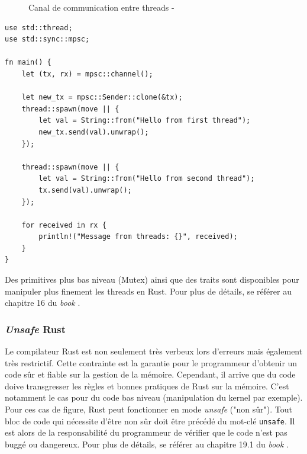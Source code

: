 \documentclass[a4paper, 12pt]{article}
\newenvironment{code}{\captionsetup{type=listing}}{}
\begin{document}
\begin{figure}
    \begin{center}
    \end{center}
    \caption{Canal de communication entre threads - \cite{ref37}}
    \label{rust_channel}
\end{figure}
\bigbreak
\begin{code}
    \begin{verbatim}
use std::thread;
use std::sync::mpsc;

fn main() {
    let (tx, rx) = mpsc::channel();

    let new_tx = mpsc::Sender::clone(&tx);
    thread::spawn(move || {
        let val = String::from("Hello from first thread");
        new_tx.send(val).unwrap();
    });

    thread::spawn(move || {
        let val = String::from("Hello from second thread");
        tx.send(val).unwrap();
    });

    for received in rx {
        println!("Message from threads: {}", received);
    }
}
    \end{verbatim}
    \caption{\textit{Message passing} avec deux producteurs et un consommateur en Rust}
    \label{rust_thread_message}
\end{code}
\bigbreak
Des primitives plus bas niveau (Mutex) ainsi que des traits sont disponibles pour manipuler 
plus finement les threads en Rust. Pour plus de détails, se référer au chapitre 16 du \textit{book} \cite{ref0}.

\subsubsection{\textit{Unsafe} Rust}
Le compilateur Rust est non seulement très verbeux lors d'erreurs mais également très restrictif. 
Cette contrainte est la garantie pour le programmeur d'obtenir un code sûr et fiable sur la gestion 
de la mémoire. Cependant, il arrive que du code doive transgresser les règles et bonnes pratiques
de Rust sur la mémoire. C'est notamment le cas pour du code bas niveau (manipulation du kernel par 
exemple). Pour ces cas de figure, Rust peut fonctionner en mode \textit{unsafe} ("non sûr"). Tout 
bloc de code qui nécessite d'être non sûr doit être précédé du mot-clé \texttt{unsafe}. 
Il est alors de la responsabilité du programmeur de vérifier que le code n'est pas buggé ou dangereux.
Pour plus de détails, se référer au chapitre 19.1 du \textit{book} \cite{ref0}.
\end{document}
